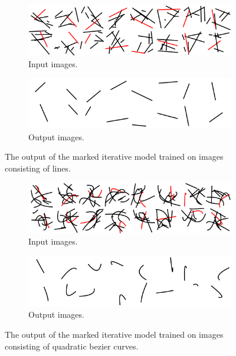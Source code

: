 \begin{figure}
    \centering
    \begin{subfigure}{.45\textwidth}
        \includegraphics[width=\textwidth]{graphics/work-artifacts/iterative/308/input.png}
        \caption{Input images.}
    \end{subfigure}
    \begin{subfigure}{.45\textwidth}
        \includegraphics[width=\textwidth]{graphics/work-artifacts/iterative/308/recons.png}
        \caption{Output images.}
    \end{subfigure}
    \caption{The output of the marked iterative model trained on images consisting of lines.}
    \label{fig:iterative.308.recons}
\end{figure}

\begin{figure}
    \centering
    \begin{subfigure}{.45\textwidth}
        \includegraphics[width=\textwidth]{graphics/work-artifacts/iterative/310/input.png}
        \caption{Input images.}
    \end{subfigure}
    \begin{subfigure}{.45\textwidth}
        \includegraphics[width=\textwidth]{graphics/work-artifacts/iterative/310/recons.png}
        \caption{Output images.}
    \end{subfigure}
    \caption{The output of the marked iterative model trained on images consisting of quadratic bezier curves.}
    \label{fig:iterative.310.recons}
\end{figure}

